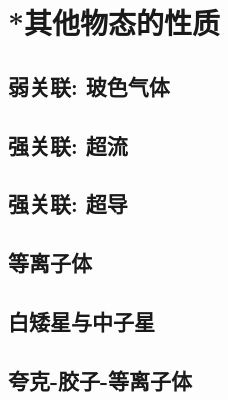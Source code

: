

\section{*其他物态的性质}\label{12-5}

\subsection{弱关联: 玻色气体}\label{12-5-1}

\subsection{强关联: 超流}\label{12-5-2}

\subsection{强关联: 超导}\label{12-5-3}

\subsection{等离子体}\label{12-5-4}

\subsection{白矮星与中子星}\label{12-5-5}

\subsection{夸克-胶子-等离子体}\label{12-5-6}